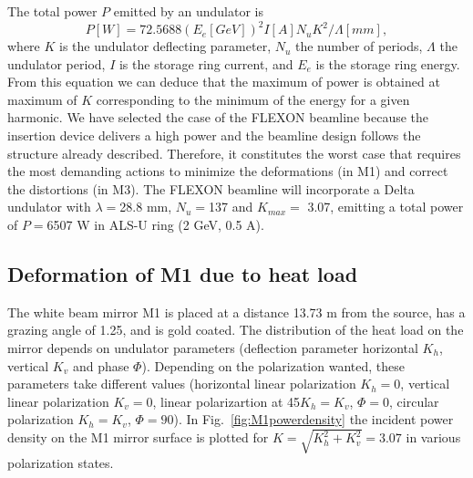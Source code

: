 \documentclass{iucr}              %
\newcommand{\todo}[1]{{\color{red}[TODO: "#1'']}}
\begin{document}
The total power $P$ emitted by an undulator is 
\begin{equation}
    P [W] = 72.5688  (E_e [GeV])^2  I[A]  N_u  K^2 / \Lambda[mm],
\end{equation}
where $K$ is the undulator deflecting parameter, $N_u$ the number of periods, $\Lambda$ the undulator period, $I$ is the storage ring current, and $E_e$ is the storage ring energy. From this equation we can deduce that the maximum of power is obtained at maximum of $K$ corresponding to the minimum of the energy for a given harmonic.  We have selected the case of the FLEXON beamline because the insertion device delivers a high power and the beamline design follows the structure already described. Therefore, it constitutes the worst case that requires the most demanding actions to minimize the deformations (in M1) and correct the distortions (in M3). The FLEXON beamline will incorporate a Delta undulator \cite{deltaundulator} with $\lambda=$28.8 mm, $N_u=$137 and $K_{max}=$ 3.07, emitting a total power of $P=$6507 W in ALS-U ring (2 GeV,  0.5 A).

\subsection{Deformation of M1 due to heat load}


The white beam mirror M1 is placed at a distance 13.73 m from the source, has a grazing angle of 1.25\textdegree, and is gold coated. The distribution of the heat load on the mirror depends on undulator parameters (deflection parameter horizontal $K_h$, vertical $K_v$ and phase $\Phi$). Depending on the polarization wanted, these parameters take different values (horizontal linear polarization $K_h=0$, vertical linear polarization $K_v=0$, linear polarizartion at 45\textdegree $K_h=K_v$, $\Phi=0$, circular polarization $K_h=K_v$, $\Phi=90$\textdegree ). In Fig.~\ref{fig:M1powerdensity} the incident power density on the M1 mirror surface is plotted for $K=\sqrt{K_h^2 + K_v^2}=3.07$ in various polarization states.
\end{document}

